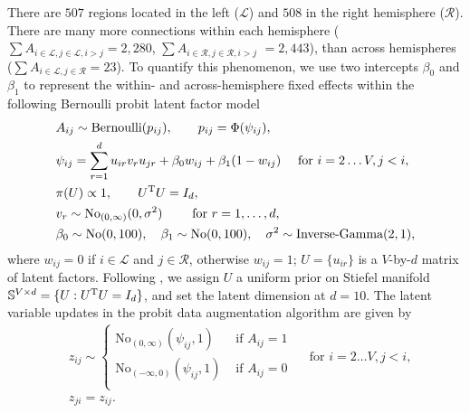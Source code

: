 \documentclass[twoside,11pt]{article}
\newcommand{\bb}[1]{\mathbb{#1}}
\newcommand{\No}{\text{No}}
\newcommand{\IG}{\text{Inverse-Gamma}}
\newcommand{\Bern}{\text{Bernoulli}}
\newcommand{\1}{\mathbf 1}
\begin{document}
{There are $507$ regions located in the left ($\mathcal{L}$) and $508$ in the right hemisphere ($\mathcal{R}$). There are many more connections within each hemisphere ($ \sum A_{i\in \mathcal{L}, j \in \mathcal{L}, i>j} = 2,280$, $\sum A_{i\in \mathcal{R}, j \in \mathcal{R}, i>j}$ $=2,443$), than across hemispheres ($\sum A_{i\in \mathcal{L}, j \in \mathcal{R}} = 23$). To quantify this phenomenon, we use two intercepts $\beta_0$ and $\beta_1$ to represent the within- and across-hemisphere fixed effects within the following Bernoulli probit latent factor model
\begin{equation*}
	\begin{aligned}
    & A_{ij} \sim   \Bern(p_{ij}), \qquad p_{ij}=\Phi(\psi_{ij}), \\
    & \psi_{ij} =\sum_{r=1}^d u_{ir} v_r u_{jr} + \beta_{0} w_{ij} + \beta_{1} (1-w_{ij})  \quad \text{ for } i=2\ldots V, j < i,\\
    & \pi(U)\propto 1, \qquad U^{\rm T}U =I_d,\\
    & v_r\sim \No_{(0,\infty)}(0, \sigma^2) \qquad \text{ for } r=1,\ldots,d,\\
    & \beta_0\sim \No(0,100), \quad \beta_1\sim \No(0,100),\quad \sigma^2\sim \IG(2,1),\\
	\end{aligned}
\end{equation*}
where $w_{ij}=0$ if $i\in \mathcal{L}$ and $j\in \mathcal{R}$, otherwise $w_{ij}=1$; $U=\{u_{ir}\}$ is a $V$-by-$d$ matrix of latent factors. Following \cite{hoff2009simulation}, we assign $U$ a uniform prior on Stiefel manifold $\bb{S}^{V\times d}=\{U:U^{\rm T}U=I_d\}$, and set the latent dimension at $d=10$. The latent variable updates in the probit data augmentation algorithm are given by
\begin{equation*}
	\begin{aligned}
  &   z_{ij}\sim \left\{
    \begin{array}{lcc}
         \No_{(0,\infty)}(\psi_{ij},1) & \text{ if } A_{ij}=1 \\
         \No_{(-\infty,0)}(\psi_{ij},1)& \text{ if } A_{ij}=0 \\
    \end{array}\right. \quad \text{ for } i=2\ldots V, j<i,\\
  &  z_{ji}=z_{ij}.\\
	\end{aligned}
\end{equation*}

}
\end{document}
